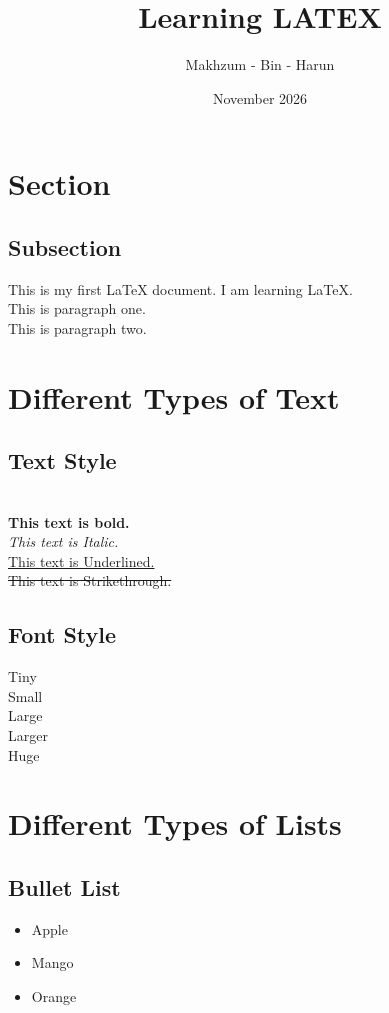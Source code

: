 \documentclass{article}
\title{Learning LATEX}
\author{Makhzum - Bin - Harun}
\date{November 2026}
\begin{document}
\maketitle

\section{Section}
\subsection{Subsection}

This is my first LaTeX document.
I am learning LaTeX.\\
This is paragraph one.\\
This is paragraph two.

\section{Different Types of Text}
\subsection{Text Style}\\
\textbf{This text is bold.}\\
\textit{This text is Italic.}\\
\underline{This text is Underlined.}\\
\st{This text is Strikethrough.}
\subsection{Font Style}
{\tiny Tiny}\\
{\small Small}\\
{\large Large}\\
{\Large Larger}\\
{\Huge Huge}

\section{Different Types of Lists}
\subsection{Bullet List}

\begin{itemize} \item Apple \item Mango \item Orange \end{itemize}
\end{document}
